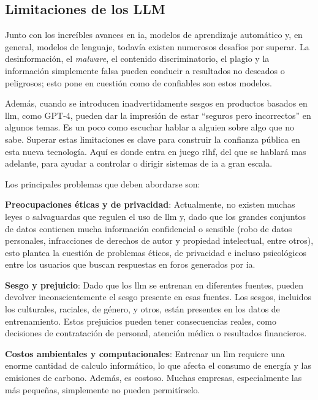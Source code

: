 \subsection{Limitaciones de los LLM}

Junto con los increíbles avances en \acrlong{ia}, modelos de aprendizaje automático y, en general, modelos de lenguaje, todavía existen numerosos desafíos por superar. La desinformación, el \textit{malware}, el contenido discriminatorio, el plagio y la información simplemente falsa pueden conducir a resultados no deseados o peligrosos; esto pone en cuestión como de confiables son estos modelos.

Además, cuando se introducen inadvertidamente sesgos en productos basados en \acrshort{llm}, como GPT-4, pueden dar la impresión de estar ``seguros pero incorrectos'' en algunos temas. Es un poco como escuchar hablar a alguien sobre algo que no sabe. Superar estas limitaciones es clave para construir la confianza pública en esta nueva tecnología. Aquí es donde entra en juego \acrshort{rlhf}, del que se hablará mas adelante, para ayudar a controlar o dirigir sistemas de \acrlong{ia} a gran escala.

Los principales problemas que deben abordarse son:

\begin{description}  

\item \textbf{Preocupaciones éticas y de privacidad}: Actualmente, no existen muchas leyes o salvaguardas que regulen el uso de \acrshort{llm} y, dado que los grandes conjuntos de datos contienen mucha información confidencial o sensible (robo de datos personales, infracciones de derechos de autor y propiedad intelectual, entre otros), esto plantea la cuestión de problemas éticos, de privacidad e incluso psicológicos entre los usuarios que buscan respuestas en foros generados por \acrlong{ia}.

\item \textbf{Sesgo y prejuicio}: Dado que los \acrshort{llm} se entrenan en diferentes fuentes, pueden devolver inconscientemente el sesgo presente en esas fuentes. Los sesgos, incluidos los culturales, raciales, de género, y otros, están presentes en los datos de entrenamiento. Estos prejuicios pueden tener consecuencias reales, como decisiones de contratación de personal, atención médica o resultados financieros.

\item \textbf{Costos ambientales y computacionales}: Entrenar un \acrlong{llm} requiere una enorme cantidad de calculo informático, lo que afecta el consumo de energía y las emisiones de carbono. Además, es costoso. Muchas empresas, especialmente las más pequeñas, simplemente no pueden permitírselo.
\end{description}

